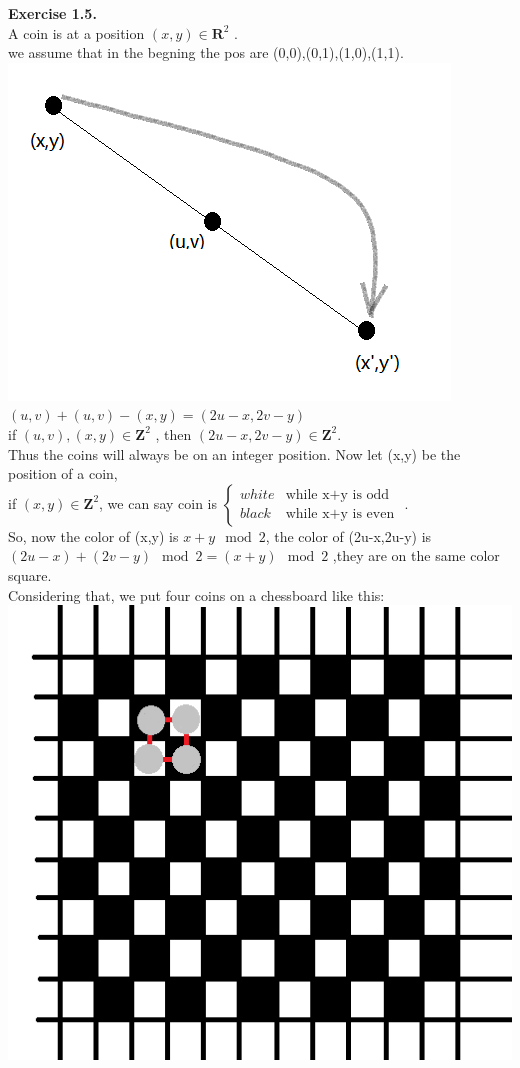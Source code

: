 \documentclass{article}
\begin{document}
\begin{flushleft}
\textbf{Exercise 1.5.} \\
A coin is at a position $(x,y)\in\mathbf{R}^2$ .\\
we assume that in the begning the pos are (0,0),(0,1),(1,0),(1,1).\\
\includegraphics[scale=1]{1_5_1.png}\\
$(u,v)+(u,v)-(x,y)=(2u-x,2v-y)$\\
if $(u,v),(x,y)\in\mathbf{Z}^2$ , then $(2u-x,2v-y)\in\mathbf{Z}^2$.\\
Thus the coins will always be on an integer position.
Now let (x,y) be the position of a coin,\\
if $(x,y)\in\mathbf{Z}^2$, we can say coin is
$
\left\{\begin{array}{ll}
white & \textrm{while x+y is odd}\\
black & \textrm{while x+y is even}
\end{array} \right.
$
.\\
So, now the color of (x,y) is $x+y\mod2$, the color of (2u-x,2u-y) is $(2u-x)+(2v-y)\mod2=(x+y)\mod2$
,they are on the same color square.\\
Considering that, we put four coins on a chessboard like this:
\includegraphics[scale=0.8]{1_5_2.png}\\

\end{flushleft}
\end{document}
